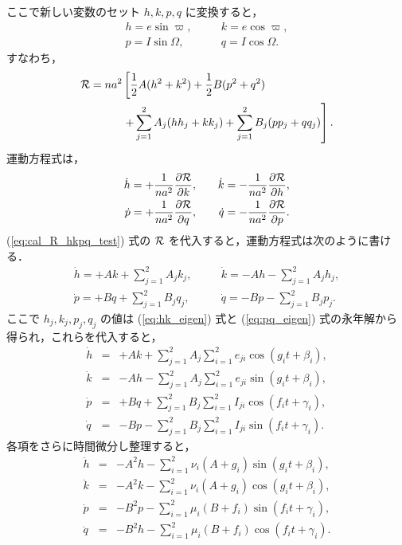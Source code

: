 \documentclass[11pt,a4paper,oneside,onecolumn]{jreport}
\begin{document}
ここで新しい変数のセット $h, k, p, q$ に変換すると，
\begin{eqnarray}
h = e \sin \varpi, & \quad & k = e \cos \varpi, \\
p = I \sin \Omega, & \quad & q = I \cos \Omega.
\end{eqnarray}
すなわち，
\begin{equation}
\begin{split}
{\cal R} = n a^2 & \left[ \frac{1}{2} A (h^2 + k^2) + \frac{1}{2} B (p^2 + q^2) \right. \\
& \left. + \sum_{j = 1}^2 A_j (h h_j + k k_j) + \sum_{j = 1}^2 B_j (p p_j + q q_j) \right]. \\
\end{split} \label{eq:cal_R_hkpq_test}
\end{equation} 
運動方程式は，
\begin{eqnarray}
\dot{h} = + \frac{1}{n a^2} \frac{\partial {\cal R}}{\partial k}, & \quad & \dot{k} = - \frac{1}{n a^2} \frac{\partial {\cal R}}{\partial h}, \\
\dot{p} = + \frac{1}{n a^2} \frac{\partial {\cal R}}{\partial q}, & \quad & \dot{q} = - \frac{1}{n a^2} \frac{\partial {\cal R}}{\partial p}.
\end{eqnarray}
(\ref{eq:cal_R_hkpq_test}) 式の ${\cal R}$ を代入すると，運動方程式は次のように書ける．
\begin{eqnarray}
\dot{h} = + A k + \sum_{j = 1}^2 A_j k_j, & \quad & \dot{k} = - A h - \sum_{j = 1}^2 A_j h_j, \\
\dot{p} = + B q + \sum_{j = 1}^2 B_j q_j, & \quad & \dot{q} = - B p - \sum_{j = 1}^2 B_j p_j.
\end{eqnarray}
ここで $h_j, k_j, p_j, q_j$ の値は (\ref{eq:hk_eigen}) 式と (\ref{eq:pq_eigen}) 式の永年解から得られ，これらを代入すると，
\begin{eqnarray}
\dot{h} & = & + A k + \sum_{j = 1}^2 A_j \sum_{i = 1}^2 e_{ji} \cos (g_i t + \beta_i), \\
\dot{k} & = & - A h - \sum_{j = 1}^2 A_j \sum_{i = 1}^2 e_{ji} \sin (g_i t + \beta_i), \\
\dot{p} & = & + B q + \sum_{j = 1}^2 B_j \sum_{i = 1}^2 I_{ji} \cos (f_i t + \gamma_i), \\
\dot{q} & = & - B p - \sum_{j = 1}^2 B_j \sum_{i = 1}^2 I_{ji} \sin (f_i t + \gamma_i).
\end{eqnarray}
各項をさらに時間微分し整理すると，
\begin{eqnarray}
\ddot{h} & = & - A^2 h - \sum_{i = 1}^2 \nu_i (A + g_i) \sin (g_i t + \beta_i), \\
\ddot{k} & = & - A^2 k - \sum_{i = 1}^2 \nu_i (A + g_i) \cos (g_i t + \beta_i), \\
\ddot{p} & = & - B^2 p - \sum_{i = 1}^2 \mu_i (B + f_i) \sin (f_i t + \gamma_i), \\
\ddot{q} & = & - B^2 h - \sum_{i = 1}^2 \mu_i (B + f_i) \cos (f_i t + \gamma_i).
\end{eqnarray}
\end{document}
